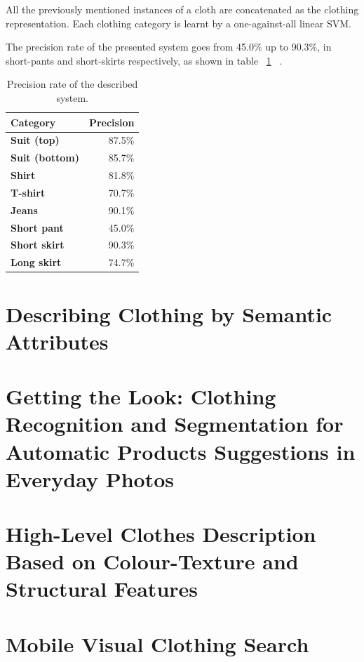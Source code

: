 \documentclass[titlepage,12pt,a4paper,times]{book}
\begin{document}
All the previously mentioned instances of a cloth are concatenated as the
clothing representation. Each clothing category is learnt by a
one-against-all linear \ac{SVM}.

The precision rate of the presented system goes from 45.0\% up to 90.3\%,
in short-pants and short-skirts respectively, as shown in table ~\ref{tab:prds}
 ~\citep{1}.

\begin{table}
\centering
\begin{tabular}{|l|r|}
\hline
\textbf{Category} & \textbf{Precision}\\
\hline
\hline
\textbf{Suit (top)} & 87.5\% \\
\hline
\textbf{Suit (bottom)} & 85.7\% \\
\hline
\textbf{Shirt} & 81.8\% \\
\hline
\textbf{T-shirt} & 70.7\% \\
\hline
\textbf{Jeans} & 90.1\% \\
\hline
\textbf{Short pant} & 45.0\% \\
\hline
\textbf{Short skirt} & 90.3\% \\
\hline
\textbf{Long skirt} & 74.7\% \\
\hline
\end{tabular}
\caption{Precision rate of the described system.}
\label{tab:prds}
\end{table}
\FloatBarrier

\section{Describing Clothing by Semantic Attributes}
\label{chap2:sec:art2}

\section{Getting the Look: Clothing Recognition and Segmentation for Automatic
Products Suggestions in Everyday Photos}
\label{chap2:sec:art3}

\section{High-Level Clothes Description Based on Colour-Texture and Structural
Features}
\label{chap2:sec:art4}

\section{Mobile Visual Clothing Search}
\label{chap2:sec:art5}
\end{document}
